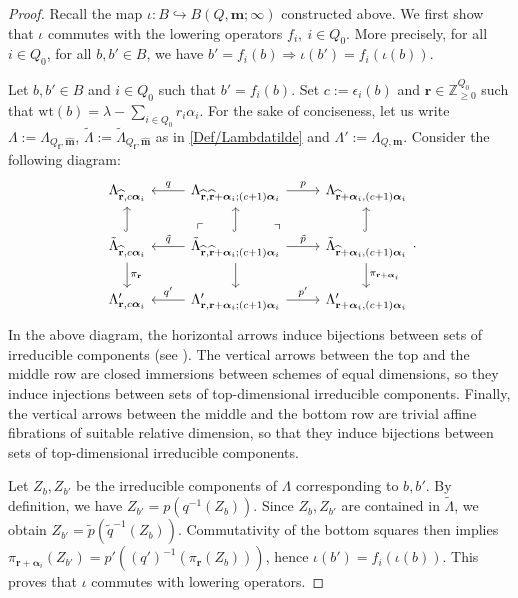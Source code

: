 \documentclass[a4paper,12pt]{article}
\theoremstyle{definition}
\theoremstyle{plain}
\theoremstyle{remark}
\newcommand\bbZ{\mathbb{Z}}
\newcommand\bfalpha{\bm{\alpha}}
\newcommand\bff{\mathbf{f}}
\newcommand\bfm{\mathbf{m}}
\newcommand\bfr{\mathbf{r}}
\begin{document}
\begin{proof}
Recall the map $\iota: B\hookrightarrow B(Q,\bfm;\infty)$ constructed above. We first show that $\iota$ commutes with the lowering operators $f_i,\ i\in Q_0$. More precisely, for all $i\in Q_0$, for all $b,b'\in B$, we have $b'=f_i(b)\Rightarrow \iota(b')=f_i(\iota(b))$.

Let $b,b'\in B$ and $i\in Q_0$ such that $b'=f_i(b)$. Set $c:=\epsilon_i(b)$ and $\bfr\in\bbZ_{\geq0}^{Q_0}$ such that $\mathrm{wt}(b)=\lambda-\sum_{i\in Q_0}r_i\alpha_i$. For the sake of conciseness, let us write $\Lambda:=\Lambda_{Q_\bff,\widehat{\bfm}}$, $\tilde{\Lambda}:=\tilde{\Lambda}_{Q_\bff,\widehat{\bfm}}$ as in \eqref{Def/Lambdatilde}  and $\Lambda':=\Lambda_{Q,\bfm}$.
Consider the following diagram:
\[
\begin{tikzcd}
\Lambda_{\widehat{\bfr},c\bfalpha_i} & \Lambda_{\widehat{\bfr},\widehat{\bfr}+\bfalpha_i;(c+1)\bfalpha_i}\ar[l,"q", swap]\ar[r,"p"] & \Lambda_{\widehat{\bfr}+\bfalpha_i,(c+1)\bfalpha_i} \\
\tilde{\Lambda}_{\widehat{\bfr},c\bfalpha_i} \ar[u,hookrightarrow]\ar[d,"\pi_\bfr"] & \tilde{\Lambda}_{\widehat{\bfr},\widehat{\bfr}+\bfalpha_i;(c+1)\bfalpha_i} \ar[u,hookrightarrow]\ar[d]\ar[l,"\tilde{q}",swap]\ar[r,"\tilde{p}"]\arrow[ul, phantom, "\ulcorner", very near start]\arrow[ur, phantom, "\urcorner", very near start] & \tilde{\Lambda}_{\widehat{\bfr}+\bfalpha_i,(c+1)\bfalpha_i} \ar[u,hookrightarrow]\ar[d,"\pi_{\bfr+\bfalpha_i}"] \\
\Lambda'_{\bfr,c\bfalpha_i} & \Lambda'_{\bfr,\bfr+\bfalpha_i;(c+1)\bfalpha_i}\ar[l,"q'",swap]\ar[r,"p'"] & \Lambda'_{\bfr+\bfalpha_i,(c+1)\bfalpha_i}
\end{tikzcd}
.
\]
In the above diagram, the horizontal arrows induce bijections between sets of irreducible components (see \cite[Lem.\ 3.6]{GLS18a}). The vertical arrows between the top and the middle row are closed immersions between schemes of equal dimensions, so they induce injections between sets of top-dimensional irreducible components. Finally, the vertical arrows between the middle and the bottom row are trivial affine fibrations of suitable relative dimension, so that they induce bijections between sets of top-dimensional irreducible components.

Let $Z_b,Z_{b'}$ be the irreducible components of $\Lambda$ corresponding to $b,b'$. By definition, we have $Z_{b'}=p(q^{-1}(Z_b))$.
Since $Z_b,Z_{b'}$ are contained in $\tilde{\Lambda}$, we obtain $Z_{b'}=\tilde{p}(\tilde{q}^{-1}(Z_b))$. Commutativity of the bottom squares then implies $\pi_{\bfr+\bfalpha_i}(Z_{b'})=p'((q')^{-1}(\pi_{\bfr}(Z_b)))$, hence $\iota(b')=f_i(\iota(b))$. This proves that $\iota$ commutes with lowering operators.


\end{proof}
\end{document}

